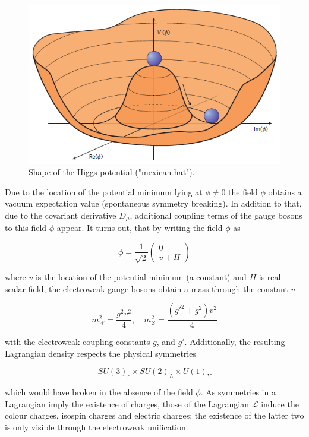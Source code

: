 \begin{figure}[h!]
	\centering
	\includegraphics[width=0.8\linewidth]{figures/theory/higgspotential}
	\caption{Shape of the Higgs potential ("mexican hat"). \cite{Ellis:2012465}}
	\label{fig:mexicanhat}
\end{figure}

Due to the location of the potential minimum lying at $\phi \neq 0$ the field $\phi$ obtains a vacuum expectation value (spontaneous symmetry breaking). In addition to that, due to the covariant derivative $D_\mu$, additional coupling terms of the gauge bosons to this field $\phi$ appear. It turns out, that by writing the field $\phi$ as

\begin{equation*}
	\phi = \frac{1}{\sqrt{2}}\left(\begin{matrix}
		0 \\
		v + H
	\end{matrix}
	\right)
\end{equation*}

where $v$ is the location of the potential minimum (a constant) and $H$ is real scalar field, the electroweak gauge bosons  obtain a mass through the constant $v$

\begin{equation*}
	m^2_W = \frac{g^2 v^2}{4}, \quad m^2_Z = \frac{(g'^2 + g^2)v^2}{4}
\end{equation*}

with the electroweak coupling constants $g$, and $g'$. Additionally, the resulting Lagrangian density respects the physical symmetries

\begin{equation*}
	SU(3)_c \times SU(2)_L \times U(1)_Y
\end{equation*}

which would have broken in the absence of the field $\phi$. As symmetries in a Lagrangian imply the existence of charges, those of the Lagrangian $\mathcal{L}$ induce the colour charges, isospin charges and electric charges; the existence of the latter two is only visible through the electroweak unification.

